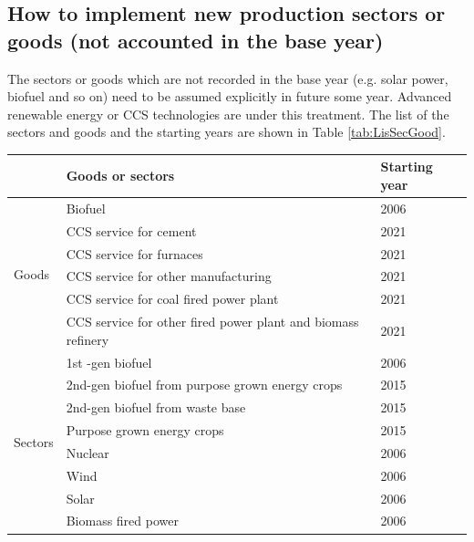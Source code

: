 \documentclass[10pt,a4paper,titlepage,dvipdfmx]{book}
\begin{document}
\begin{itemize}
\section{\label{sec:HowImpNewProSec}How to implement new production sectors or goods (not accounted in the base year) }

The sectors or goods which are not recorded in the base year (e.g. solar power, biofuel and so on) need to be assumed explicitly in future some year. Advanced renewable energy or CCS technologies are under this treatment. The list of the sectors and goods and the starting years are shown in Table \ref{tab:LisSecGood}.


\begin{tabularx}{\textwidth}{|
p{}|
p{}|
p{}|} 
\caption{\label{tab:LisSecGood}List of sectors and goods which are not accounted base year, but newly introduced in the future scenarios and the starting years}\\
\hline 
 & Goods or sectors & Starting year \\\hline 
\multirow{6}{=}{Goods}  & Biofuel & 2006 \\\cline{2-3}
 & CCS service for cement & 2021 \\\cline{2-3}
 & CCS service for furnaces & 2021 \\\cline{2-3}
 & CCS service for other manufacturing & 2021 \\\cline{2-3}
 & CCS service for coal fired power plant & 2021 \\\cline{2-3}
 & CCS service for other fired power plant and biomass refinery & 2021 \\\hline 
\multirow{8}{=}{Sectors}  & 1st -gen biofuel & 2006 \\\cline{2-3}
 & 2nd-gen biofuel from purpose grown energy crops  & 2015 \\\cline{2-3}
 & 2nd-gen biofuel from waste base & 2015 \\\cline{2-3}
 & Purpose grown energy crops & 2015 \\\cline{2-3}
 & Nuclear & 2006 \\\cline{2-3}
 & Wind & 2006 \\\cline{2-3}
 & Solar & 2006 \\\cline{2-3}
 & Biomass fired power & 2006 \\\hline 
\end{tabularx}


\end{itemize}
\end{document}
